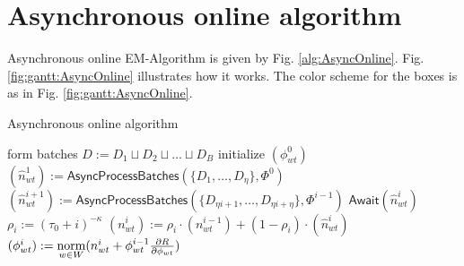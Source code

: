 \documentclass[russian,english]{llncs}
\newcommand{\norm}{\mathop{\rm norm}\limits}
\newcommand{\kw}[1]{\textsf{#1}}
\begin{document}
\section{Asynchronous online algorithm}
\label{sec:AsyncOnline}

Asynchronous online EM-Algorithm is given by Fig. \ref{alg:AsyncOnline}.
Fig. \ref{fig:gantt:AsyncOnline} illustrates how it works.
The color scheme for the boxes is as in Fig. \ref{fig:gantt:AsyncOnline}.

\SetAlgoSkip{}
\begin{algorithm2e}[h]
\caption{Asynchronous online algorithm} %
\label{alg:AsyncOnline}
\BlankLine
{}
\BlankLine
form batches $D := D_1 \sqcup D_2 \sqcup \dots \sqcup D_B$\;
initialize $(\phi^0_{wt})$\;
$(\hat n^1_{wt}) := \kw{AsyncProcessBatches}(\{D_{1}, \dots, D_{\eta}\}, \Phi^0)$\;
 {
    $(\hat n^{i+1}_{wt}) := \kw{AsyncProcessBatches}(\{D_{\eta i + 1}, \dots, D_{\eta i + \eta}\}, \Phi^{i-1})$\;
    $\kw{Await}(\hat n^i_{wt})$\;
    $\rho_i := (\tau_0 + i)^{-\kappa}$\;
    $(n^{i}_{wt}) := \rho_i \cdot (n^{i-1}_{wt}) + (1 - \rho_i) \cdot (\hat n^{i}_{wt})$\;
    $(\phi^{i}_{wt}) := \norm_{w \in W} (n^{i}_{wt} + \phi^{i-1}_{wt} \frac{\partial R}{\partial \phi_{wt}})$\;
}
\end{algorithm2e}
\end{document}
